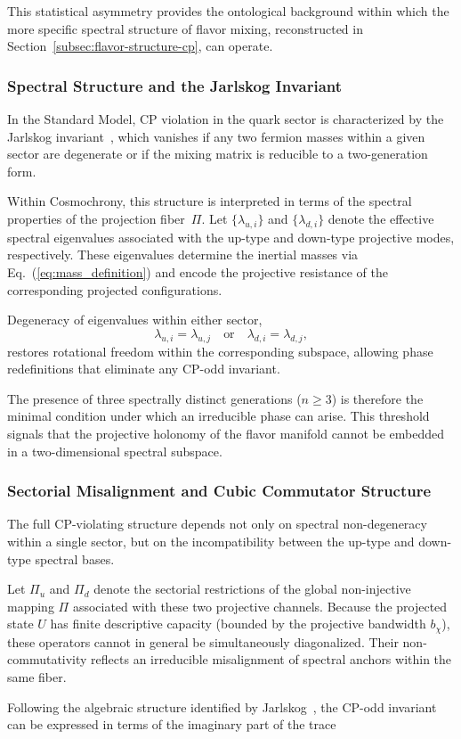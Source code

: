     This statistical asymmetry provides the ontological background
    within which the more specific spectral structure of flavor mixing,
    reconstructed in Section~\ref{subsec:flavor-structure-cp},
    can operate.

  \subsubsection*{Spectral Structure and the Jarlskog Invariant}

    In the Standard Model, CP violation in the quark sector is characterized
    by the Jarlskog invariant~\cite{Jarlskog1985}, which vanishes if any two
    fermion masses within a given sector are degenerate or if the mixing
    matrix is reducible to a two-generation form.

    Within Cosmochrony, this structure is interpreted in terms of the
    spectral properties of the projection fiber~$\Pi$.
    Let $\{\lambda_{u,i}\}$ and $\{\lambda_{d,i}\}$ denote the effective
    spectral eigenvalues associated with the up-type and down-type projective
    modes, respectively.
    These eigenvalues determine the inertial masses via
    Eq.~(\ref{eq:mass_definition}) and encode the projective resistance of
    the corresponding projected configurations.

    Degeneracy of eigenvalues within either sector,
    \[
      \lambda_{u,i} = \lambda_{u,j}
      \quad \text{or} \quad
      \lambda_{d,i} = \lambda_{d,j},
    \]
    restores rotational freedom within the corresponding subspace,
    allowing phase redefinitions that eliminate any CP-odd invariant.

    The presence of three spectrally distinct generations
    ($n \geq 3$) is therefore the minimal condition under which an
    irreducible phase can arise.
    This threshold signals that the projective holonomy of the flavor
    manifold cannot be embedded in a two-dimensional spectral subspace.

  \subsubsection*{Sectorial Misalignment and Cubic Commutator Structure}

    The full CP-violating structure depends not only on spectral
    non-degeneracy within a single sector, but on the incompatibility
    between the up-type and down-type spectral bases.

    Let $\Pi_u$ and $\Pi_d$ denote the sectorial restrictions of the
    global non-injective mapping $\Pi$ associated with these two
    projective channels.
    Because the projected state $U$ has finite descriptive capacity
    (bounded by the projective bandwidth $b_\chi$),
    these operators cannot in general be simultaneously diagonalized.
    Their non-commutativity reflects an irreducible misalignment of
    spectral anchors within the same fiber.

    Following the algebraic structure identified by
    Jarlskog~\cite{Jarlskog1985}, the CP-odd invariant can be expressed
    in terms of the imaginary part of the trace
